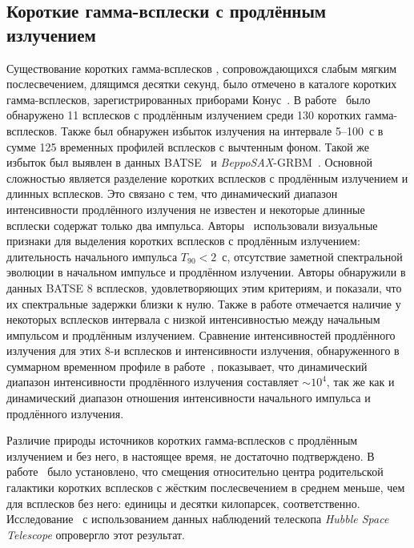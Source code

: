 \subsection{Короткие гамма-всплески с продлённым излучением}
Существование коротких гамма-всплесков , сопровождающихся слабым мягким послесвечением, 
длящимся десятки секунд, было отмечено в каталоге коротких гамма-всплесков, 
зарегистрированных приборами Конус~\citep{Mazets_2002astro_ph}. В работе~\cite{Frederiks_2004ASPC} 
было обнаружено 11 всплесков с продлённым излучением среди 130 коротких гамма-всплесков. 
Также был обнаружен избыток излучения на интервале 5--100~с в сумме 125 временных 
профилей всплесков с вычтенным фоном. Такой же избыток был выявлен в данных 
BATSE~\citep{Lazzati_2001AandA, Connaughton_2002ApJ} и \textit{BeppoSAX}-GRBM~\citep{Montanari_2005ApJ}. 
Основной сложностью является разделение коротких всплесков с продлённым излучением 
и длинных всплесков. Это связано с тем, что динамический диапазон интенсивности 
продлённого излучения не известен и некоторые длинные всплески содержат только 
два импульса. Авторы~\citep{Norris_and_Bonnel_2006} использовали визуальные признаки 
для выделения коротких всплесков с продлённым излучением: длительность начального 
импульса $T_{90}<2$~с, отсутствие заметной спектральной эволюции в начальном 
импульсе и продлённом излучении. Авторы обнаружили в данных BATSE 8 всплесков, 
удовлетворяющих этим критериям, и показали, что их спектральные задержки близки к нулю. 
Также в работе отмечается наличие у некоторых всплесков интервала с низкой интенсивностью 
между начальным импульсом и продлённым излучением. Сравнение интенсивностей продлённого 
излучения для этих 8-и всплесков и интенсивности излучения, обнаруженного в 
суммарном временном профиле в работе~\citep{Lazzati_2001AandA}, показывает, 
что динамический диапазон интенсивности продлённого излучения составляет $\sim 10^4$, 
так же как и динамический диапазон отношения интенсивности начального импульса и продлённого излучения.

Различие природы источников коротких гамма-всплесков с продлённым излучением и 
без него, в настоящее время, не достаточно подтверждено. В работе~\citep{Troja_2008MNRAS} 
было установлено, что смещения относительно центра родительской галактики 
коротких всплесков с жёстким послесвечением в среднем меньше, чем для всплесков без него: 
единицы и десятки килопарсек, соответственно. 
Исследование~\citep{Fong_2010ApJ} с использованием данных наблюдений 
телескопа \textit{Hubble Space Telescope} опровергло этот результат.

